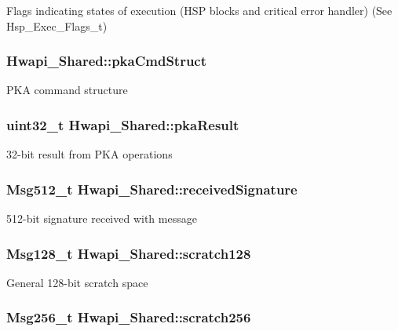 Flags indicating states of execution (H\-S\-P blocks and critical error handler) (See {\ttfamily Hsp\-\_\-\-Exec\-\_\-\-Flags\-\_\-t}) \hypertarget{structHwapi__Shared_a3b016cdb0f49bc77abcb05759a407cfa}{
\subsubsection[{pka\-Cmd\-Struct}]{ Hwapi\-\_\-\-Shared\-::pka\-Cmd\-Struct}}\label{structHwapi__Shared_a3b016cdb0f49bc77abcb05759a407cfa}
P\-K\-A command structure \hypertarget{structHwapi__Shared_a7091376acf43318e1bbfe927d8797280}{
\subsubsection[{pka\-Result}]{\setlength{\rightskip}{0pt plus 5cm}uint32\-\_\-t Hwapi\-\_\-\-Shared\-::pka\-Result}}\label{structHwapi__Shared_a7091376acf43318e1bbfe927d8797280}
32-\/bit result from P\-K\-A operations \hypertarget{structHwapi__Shared_a5a0ab22ff83cfa5068205541ba53f9a5}{
\subsubsection[{received\-Signature}]{\setlength{\rightskip}{0pt plus 5cm}Msg512\-\_\-t Hwapi\-\_\-\-Shared\-::received\-Signature}}\label{structHwapi__Shared_a5a0ab22ff83cfa5068205541ba53f9a5}
512-\/bit signature received with message \hypertarget{structHwapi__Shared_ae80da535be9e6646c842093311f11e2c}{
\subsubsection[{scratch128}]{\setlength{\rightskip}{0pt plus 5cm}Msg128\-\_\-t Hwapi\-\_\-\-Shared\-::scratch128}}\label{structHwapi__Shared_ae80da535be9e6646c842093311f11e2c}
General 128-\/bit scratch space \hypertarget{structHwapi__Shared_a55737bd4edbd0b34d22bde76ad93026d}{
\subsubsection[{scratch256}]{\setlength{\rightskip}{0pt plus 5cm}Msg256\-\_\-t Hwapi\-\_\-\-Shared\-::scratch256}}\label{structHwapi__Shared_a55737bd4edbd0b34d22bde76ad93026d}
